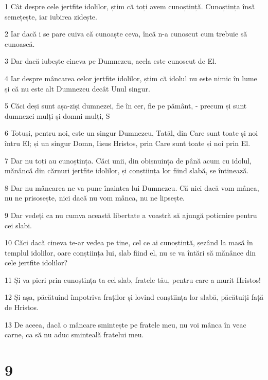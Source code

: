 \par 1 Cât despre cele jertfite idolilor, știm că toți avem cunoștință. Cunoștința însă semețește, iar iubirea zidește.
\par 2 Iar dacă i se pare cuiva că cunoaște ceva, încă n-a cunoscut cum trebuie să cunoască.
\par 3 Dar dacă iubește cineva pe Dumnezeu, acela este cunoscut de El.
\par 4 Iar despre mâncarea celor jertfite idolilor, știm că idolul nu este nimic în lume și că nu este alt Dumnezeu decât Unul singur.
\par 5 Căci deși sunt așa-ziși dumnezei, fie în cer, fie pe pământ, - precum și sunt dumnezei mulți și domni mulți, S
\par 6 Totuși, pentru noi, este un singur Dumnezeu, Tatăl, din Care sunt toate și noi întru El; și un singur Domn, Iisus Hristos, prin Care sunt toate și noi prin El.
\par 7 Dar nu toți au cunoștința. Căci unii, din obișnuința de până acum cu idolul, mănâncă din cărnuri jertfite idolilor, și conștiința lor fiind slabă, se întinează.
\par 8 Dar nu mâncarea ne va pune înaintea lui Dumnezeu. Că nici dacă vom mânca, nu ne prisosește, nici dacă nu vom mânca, nu ne lipsește.
\par 9 Dar vedeți ca nu cumva această libertate a voastră să ajungă poticnire pentru cei slabi.
\par 10 Căci dacă cineva te-ar vedea pe tine, cel ce ai cunoștință, șezând la masă în templul idolilor, oare conștiința lui, slab fiind el, nu se va întări să mănânce din cele jertfite idolilor?
\par 11 Și va pieri prin cunoștința ta cel slab, fratele tău, pentru care a murit Hristos!
\par 12 Și așa, păcătuind împotriva fraților și lovind conștiința lor slabă, păcătuiți față de Hristos.
\par 13 De aceea, dacă o mâncare smintește pe fratele meu, nu voi mânca în veac carne, ca să nu aduc sminteală fratelui meu.

\chapter{9}

